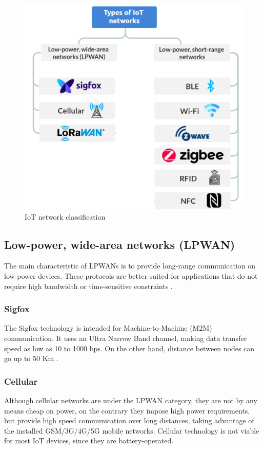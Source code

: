 \begin{figure}[h]
    \centering
    \includegraphics[width=.9\linewidth]{images/TypeOfNetworks.png}
    \caption{IoT network classification}
    \label{fig:NetworkClassification}
\end{figure}


\subsection{Low-power, wide-area networks (LPWAN)}
The main characteristic of LPWANs is to provide long-range communication on low-power devices. These protocols are better suited for applications that do not require high bandwidth or time-sensitive constraints \cite{BehrTech:protocols}.

\subsubsection{Sigfox}
The Sigfox technology is intended for Machine-to-Machine (M2M) communication. It uses an Ultra Narrow Band channel, making data transfer speed as low as 10 to 1000 bps. On the other hand, distance between nodes can go up to 50 Km \cite{IEEE:protocols}.

\subsubsection{Cellular}
Although cellular networks are under the LPWAN category, they are not by any means cheap on power, on the contrary they impose high power requirements, but provide high speed communication over long distances, taking advantage of the installed GSM/3G/4G/5G mobile networks. Cellular technology is not viable for most IoT devices, since they are battery-operated.

